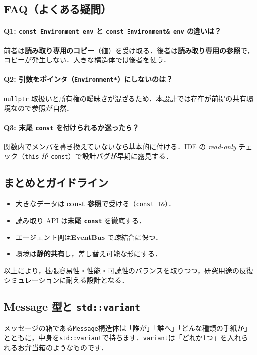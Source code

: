 \documentclass[10pt,letterpaper]{jsarticle}
\begin{document}
\subsection{FAQ（よくある疑問）}
\paragraph{Q1: \texttt{const Environment env} と \texttt{const Environment\& env} の違いは？}
前者は\textbf{読み取り専用のコピー}（値）を受け取る．後者は\textbf{読み取り専用の参照}で，コピーが発生しない．大きな構造体では後者を使う．

\paragraph{Q2: 引数をポインタ（\texttt{Environment*}）にしないのは？}
\texttt{nullptr} 取扱いと所有権の曖昧さが混ざるため．本設計では存在が前提の共有環境なので参照が自然．

\paragraph{Q3: 末尾 \texttt{const} を付けられるか迷ったら？}
関数内でメンバを書き換えていないなら基本的に付ける．IDE の \emph{read-only} チェック（\texttt{this} が \texttt{const}）で設計バグが早期に露見する．

\subsection{まとめとガイドライン}
\begin{itemize}
\item 大きなデータは \textbf{const 参照}で受ける（\texttt{const T\&}）．
\item 読み取り API は\textbf{末尾 \texttt{const}} を徹底する．
\item エージェント間は\textbf{EventBus} で疎結合に保つ．
\item 環境は\textbf{静的共有}し，差し替え可能な形にする．
\end{itemize}

以上により，拡張容易性・性能・可読性のバランスを取りつつ，研究用途の反復シミュレーションに耐える設計となる．

\subsection{Message 型と \texttt{std::variant}}\label{app:message}
メッセージの箱である\texttt{Message}構造体は「誰が」「誰へ」「どんな種類の手紙か」とともに，中身を\texttt{std::variant}で持ちます．\texttt{variant}は「どれか1つ」を入れられるお弁当箱のようなものです．
\end{document}
